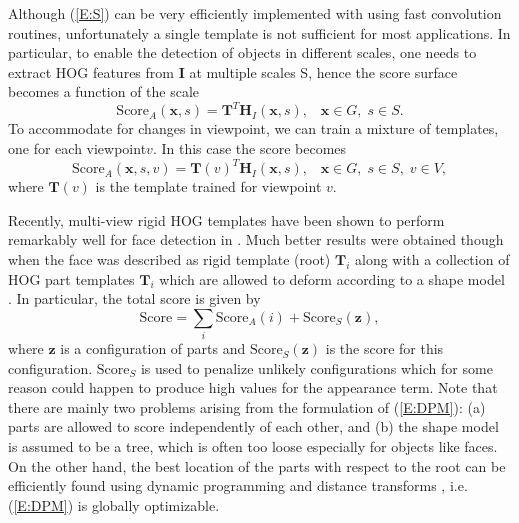 \documentclass[runningheads]{llncs}
\begin{document}
Although (\ref{E:S}) can be very efficiently implemented with using fast convolution routines, unfortunately a single template is not sufficient for most applications. In particular, to enable the detection of objects in different scales, one needs to extract HOG features from $\mathbf{I}$ at multiple scales S, hence the score surface becomes a function of the scale
\begin{equation}
\textrm{Score}_A(\mathbf{x}, s) = \mathbf{T}^T \mathbf{H}_I(\mathbf{x}, s), \;\;\; \mathbf{x} \in G, \; s \in S. \label{E:S1}
\end{equation}   
To accommodate for changes in viewpoint, we can train a mixture of templates, one for each viewpoint$v$. In this case the score becomes
\begin{equation}
\textrm{Score}_A(\mathbf{x}, s, v) = \mathbf{T}(v)^T \mathbf{H}_I(\mathbf{x}, s), \;\;\; \mathbf{x} \in G, \; s \in S, \; v \in V, \label{E:S2}
\end{equation}
where $\mathbf{T}(v)$ is the template trained for viewpoint $v$. 

Recently, multi-view rigid HOG templates have been shown to perform remarkably well for face detection in \cite{ramanan2011}. Much better results were obtained though when the face was described as rigid template (root) $\mathbf{T}_i$ along with a collection of HOG part templates $\mathbf{T}_i$ which are allowed to deform according to a shape model \cite{felzenszwalb2005pictorial, felzenszwalb2010object}. In particular, the total score is given by
\begin{equation}
\textrm{Score} = \sum_i\textrm{Score}_A(i) + \textrm{Score}_S(\mathbf{z}), \label{E:DPM}
\end{equation}
where $\mathbf{z}$ is a configuration of parts and $\textrm{Score}_S(\mathbf{z})$ is the score for this configuration. $\textrm{Score}_S$ is used to penalize unlikely configurations which for some reason could happen to produce high values for the appearance term. Note that there are mainly two problems arising from the formulation of (\ref{E:DPM}): (a) parts are allowed to score independently of each other, and (b) the shape model is assumed to be a tree, which is often too loose especially for objects like faces. On the other hand, the best location of the parts with respect to the root can be efficiently found using dynamic programming and distance transforms \cite{felzenszwalb2010object}, i.e. (\ref{E:DPM}) is globally optimizable. 
\end{document}
